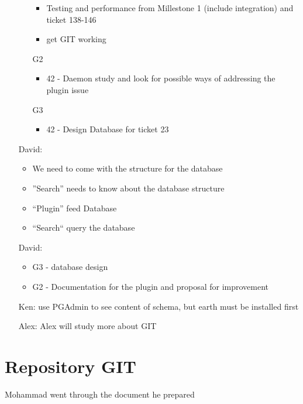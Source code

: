 \documentclass[a4paper,10pt]{article}
\begin{document}
\begin{enumerate}
\begin{itemize}
\begin{itemize}
                       \item Testing and performance from Millestone 1 (include integration) and ticket 138-146
                       \item get GIT working
                      \end{itemize}
            \item[G2]\begin{itemize}
                      \item 42 - Daemon study and look for possible ways of addressing the plugin issue
                     \end{itemize}
            \item[G3]\begin{itemize}
                      \item 42 - Design Database for ticket 23
                     \end{itemize}
            \end{itemize}
            
\item[David:]\begin{itemize}
              \item We need to come with the structure for the database
              \item ''Search'' needs to know about the database structure
              \item ``Plugin'' feed Database
              \item ``Search`` query the database
             \end{itemize}
             
\item[David:] \begin{itemize}
               \item G3 - database design
               \item G2 - Documentation for the plugin and proposal for improvement
              \end{itemize}
              
\item[Ken:] use PGAdmin to see content of schema, but earth must be installed first

\item[Alex:] Alex will study more about GIT

\end{enumerate} 


\section*{Repository GIT}
Mohammad went through the document he prepared
\end{document}
